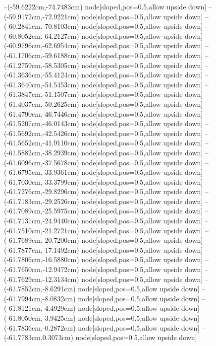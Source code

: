 --(-59.6222cm,-74.7483cm) node[sloped,pos=0.5,allow upside down]{\ArrowIn}
--(-59.9172cm,-72.9221cm) node[sloped,pos=0.5,allow upside down]{\ArrowIn}
--(-60.2841cm,-70.8103cm) node[sloped,pos=0.5,allow upside down]{\ArrowIn}
--(-60.8052cm,-64.2127cm) node[sloped,pos=0.5,allow upside down]{\ArrowIn}
--(-60.9796cm,-62.6954cm) node[sloped,pos=0.5,allow upside down]{\ArrowIn}
--(-61.1706cm,-59.6188cm) node[sloped,pos=0.5,allow upside down]{\ArrowIn}
--(-61.2759cm,-58.5305cm) node[sloped,pos=0.5,allow upside down]{\ArrowIn}
--(-61.3636cm,-55.4124cm) node[sloped,pos=0.5,allow upside down]{\ArrowIn}
--(-61.3640cm,-54.5453cm) node[sloped,pos=0.5,allow upside down]{\arrowIn}
--(-61.3847cm,-51.1507cm) node[sloped,pos=0.5,allow upside down]{\ArrowIn}
--(-61.4037cm,-50.2625cm) node[sloped,pos=0.5,allow upside down]{\arrowIn}
--(-61.4790cm,-46.7446cm) node[sloped,pos=0.5,allow upside down]{\ArrowIn}
--(-61.5207cm,-46.0143cm) node[sloped,pos=0.5,allow upside down]{\arrowIn}
--(-61.5692cm,-42.5426cm) node[sloped,pos=0.5,allow upside down]{\ArrowIn}
--(-61.5652cm,-41.9110cm) node[sloped,pos=0.5,allow upside down]{\arrowIn}
--(-61.5882cm,-38.2939cm) node[sloped,pos=0.5,allow upside down]{\ArrowIn}
--(-61.6096cm,-37.5678cm) node[sloped,pos=0.5,allow upside down]{\arrowIn}
--(-61.6795cm,-33.9361cm) node[sloped,pos=0.5,allow upside down]{\ArrowIn}
--(-61.7030cm,-33.3799cm) node[sloped,pos=0.5,allow upside down]{\arrowIn}
--(-61.7276cm,-29.8296cm) node[sloped,pos=0.5,allow upside down]{\ArrowIn}
--(-61.7183cm,-29.2526cm) node[sloped,pos=0.5,allow upside down]{\arrowIn}
--(-61.7089cm,-25.5975cm) node[sloped,pos=0.5,allow upside down]{\ArrowIn}
--(-61.7131cm,-24.9440cm) node[sloped,pos=0.5,allow upside down]{\arrowIn}
--(-61.7510cm,-21.2721cm) node[sloped,pos=0.5,allow upside down]{\ArrowIn}
--(-61.7689cm,-20.7200cm) node[sloped,pos=0.5,allow upside down]{\arrowIn}
--(-61.7877cm,-17.1492cm) node[sloped,pos=0.5,allow upside down]{\ArrowIn}
--(-61.7806cm,-16.5880cm) node[sloped,pos=0.5,allow upside down]{\arrowIn}
--(-61.7650cm,-12.9472cm) node[sloped,pos=0.5,allow upside down]{\ArrowIn}
--(-61.7629cm,-12.3134cm) node[sloped,pos=0.5,allow upside down]{\arrowIn}
--(-61.7852cm,-8.6291cm) node[sloped,pos=0.5,allow upside down]{\ArrowIn}
--(-61.7994cm,-8.0832cm) node[sloped,pos=0.5,allow upside down]{\arrowIn}
--(-61.8121cm,-4.4929cm) node[sloped,pos=0.5,allow upside down]{\ArrowIn}
--(-61.8050cm,-3.9425cm) node[sloped,pos=0.5,allow upside down]{\arrowIn}
--(-61.7836cm,-0.2872cm) node[sloped,pos=0.5,allow upside down]{\ArrowIn}
--(-61.7783cm,0.3073cm) node[sloped,pos=0.5,allow upside down]{\arrowIn}
